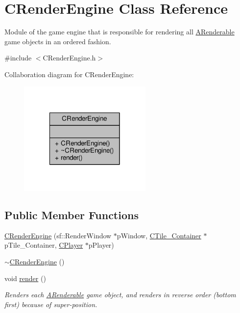 \hypertarget{classCRenderEngine}{\section{C\-Render\-Engine Class Reference}
\label{classCRenderEngine}
}


Module of the game engine that is responsible for rendering all \hyperlink{classARenderable}{A\-Renderable} game objects in an ordered fashion.  




{\ttfamily \#include $<$C\-Render\-Engine.\-h$>$}



Collaboration diagram for C\-Render\-Engine\-:\nopagebreak
\begin{figure}[H]
\begin{center}
\leavevmode
\includegraphics[width=186pt]{classCRenderEngine__coll__graph}
\end{center}
\end{figure}
\subsection*{Public Member Functions}
\begin{DoxyCompactItemize}
\item 
\hyperlink{classCRenderEngine_abb9a5a04b9c51e6ee44d0a51a6633d8d}{C\-Render\-Engine} (sf\-::\-Render\-Window $\ast$p\-Window, \hyperlink{classCTile__Container}{C\-Tile\-\_\-\-Container} $\ast$p\-Tile\-\_\-\-Container, \hyperlink{classCPlayer}{C\-Player} $\ast$p\-Player)
\item 
\hyperlink{classCRenderEngine_aa30932df40eda7760a6357308eb7edac}{$\sim$\-C\-Render\-Engine} ()
\item 
void \hyperlink{classCRenderEngine_a38c058de2a8b54f208decdaa7b799ada}{render} ()
\begin{DoxyCompactList}\small\item\em Renders each \hyperlink{classARenderable}{A\-Renderable} game object, and renders in reverse order (bottom first) because of super-\/position. \end{DoxyCompactList}\end{DoxyCompactItemize}


